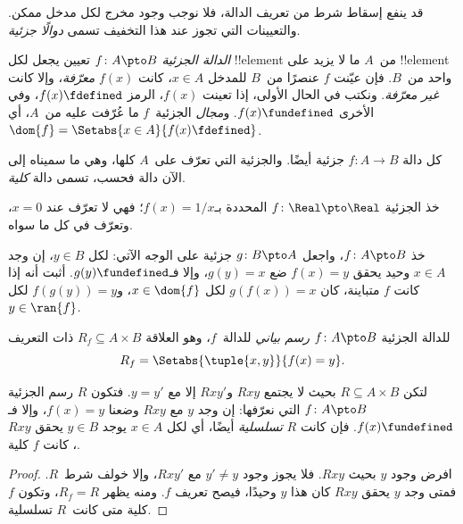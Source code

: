 \documentclass[../../../include/open-logic-section]{subfiles}
\begin{document}


\begin{explain}
قد ينفع إسقاط شرط من تعريف الدالة، فلا نوجب وجود مخرج لكل مدخل
ممكن. والتعيينات التي تجوز عند هذا التخفيف تسمى \emph{دوالًا جزئية}.
\end{explain}

\begin{defn}
\emph{الدالة الجزئية} $f \colon A \pto B$ تعيين يجعل لكل
!!{element} من~$A$ ما لا يزيد على !!{element} واحد من~$B$.
فإن عيّنت $f$ عنصرًا من~$B$ للمدخل $x \in A$، كانت $f(x)$
\emph{معرّفة}، وإلا كانت \emph{غير معرّفة}. ونكتب في الحال الأولى،
إذا تعينت $f(x)$، الرمز $f(x) \fdefined$، وفي الأخرى $f(x) \fundefined$.
و\emph{مجال} الجزئية~$f$ ما عُرّفت عليه من~$A$، أي
$\dom{f} = \Setabs{x \in A}{f(x) \fdefined}$.
\end{defn}

\begin{ex}
كل دالة $f\colon A \to B$ جزئية أيضًا. والجزئية التي تعرّف على~$A$
كلها، وهي ما سميناه إلى الآن دالة فحسب، تسمى دالة \emph{كلية}.
\end{ex}

\begin{ex}
خذ الجزئية $f \colon \Real \pto \Real$ المحددة بـ$f(x) = 1/x$؛
فهي لا تعرّف عند $x = 0$، وتعرّف في كل ما سواه.
\end{ex}

\begin{prob}
خذ $f\colon A \pto B$، واجعل $g\colon B \pto A$ جزئية على الوجه
الآتي: لكل $y \in B$، إن وجد $x \in A$ وحيد يحقق $f(x) = y$
ضع $g(y) = x$، وإلا فـ$g(y) \fundefined$. أثبت أنه إذا كانت
$f$ متباينة، كان $g(f(x)) = x$ لكل $x \in \dom{f}$،
و$f(g(y)) = y$ لكل $y \in \ran{f}$.
\end{prob}

\begin{defn}
للدالة الجزئية $f\colon A \pto B$ \emph{رسم بياني} للدالة~$f$، وهو العلاقة
$R_f \subseteq A \times B$ ذات التعريف
\[
R_f = \Setabs{\tuple{x,y}}{f(x) = y}.
\]
\end{defn}

\begin{prop}
لتكن $R \subseteq A \times B$ بحيث لا يجتمع $Rxy$ و$Rxy'$ إلا مع
$y = y'$. فتكون $R$ رسم الجزئية $f\colon A \pto B$ التي نعرّفها:
إن وجد $y$ مع $Rxy$ وضعنا $f(x) = y$، وإلا فـ$f(x) \fundefined$.
فإن كانت $R$ \emph{تسلسلية} أيضًا، أي لكل $x \in A$ يوجد
$y \in B$ يحقق $Rxy$، كانت $f$ كلية.
\end{prop}

\begin{proof}
افرض وجود $y$ بحيث $Rxy$. فلا يجوز وجود $y' \neq y$ مع $Rxy'$،
وإلا خولف شرط~$R$. فمتى وجد $y$ يحقق $Rxy$ كان هذا $y$ وحيدًا،
فيصح تعريف $f$. ومنه يظهر $R_f = R$، وتكون $f$ كلية متى
كانت~$R$ تسلسلية.
\end{proof}
\end{document}
